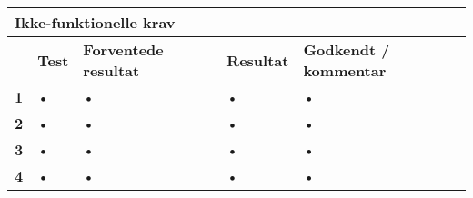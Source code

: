 
\begin{longtable}{|p{5mm}|p{40mm}|p{40mm}|p{20mm}|p{25mm}|}
\hline 
\multicolumn{5}{|l|}{\textbf{Ikke-funktionelle krav}} \\ 
\hline 
& \textbf{Test} & \textbf{Forventede resultat} & \textbf{Resultat} & \textbf{Godkendt / kommentar} \\ 
\hline 
\textbf{1}& • & • & • & • \\ 
\hline 
\textbf{2}& • & • & • & • \\ 
\hline 
\textbf{3}& • & • & • & • \\ 
\hline 
\textbf{4}& • & • & • & • \\ 
\hline 
\end{longtable}

